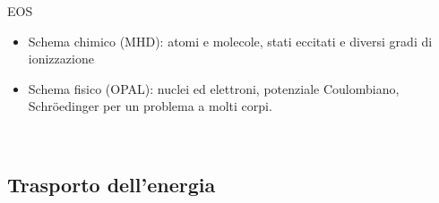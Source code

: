 \begin{frame}{EOS}

\begin{itemize}
\item Schema chimico (MHD): atomi e molecole, stati eccitati e diversi gradi di ionizzazione

\item Schema fisico (OPAL): nuclei ed elettroni, potenziale Coulombiano, Schr\"oedinger per un problema a molti corpi.
\end{itemize}

\begin{figure}[!ht]
\label{ionfraction}
~
\end{figure}


\end{frame}


\subsection{Trasporto dell'energia}


